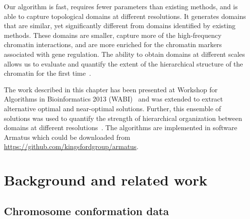 \documentclass[12pt]{cmuthesis}
\begin{document}

Our algorithm is fast, requires fewer parameters than existing methods, and is able to capture topological domains at different resolutions. It generates domains that are similar, yet significantly different from domains identified by existing methods. These domains are smaller, capture more of the high-frequency chromatin interactions, and are more enriched for the chromatin markers associated with gene regulation. The ability to obtain domains at different scales allows us to evaluate and quantify the extent of the hierarchical structure of the chromatin for the first time~\cite{ArmatusAMB}.



The work described in this chapter has been presented at Workshop for Algorithms in Bioinformatics 2013 (WABI)~\cite{Filippova2013} and was extended to extract alternative optimal and near-optimal solutions. Further, this ensemble of solutions was used to quantify the strength of hierarchical organization between domains at different resolutions~\cite{ArmatusAMB}. The algorithms are implemented in software Armatus which could be downloaded from \url{https://github.com/kingsfordgroup/armatus}.

\section{Background and related work}

  \subsection{Chromosome conformation data}

\end{document}
